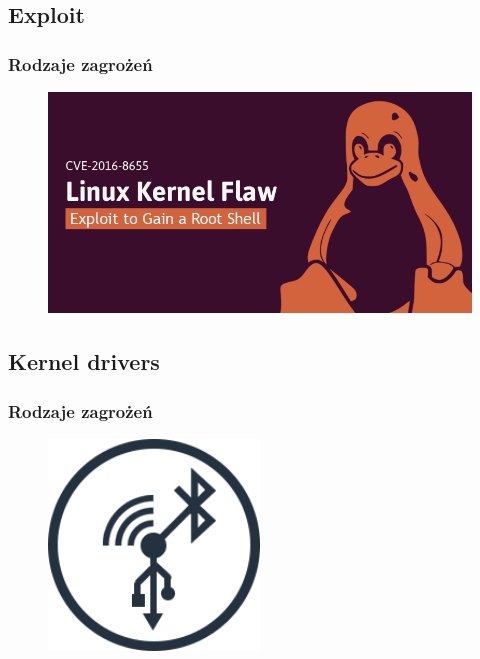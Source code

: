 \documentclass{beamer}
\begin{document}
\subsection{Exploit}
\begin{frame}
	\frametitle{Rodzaje zagrożeń}
	\begin{figure}[H]
	\centering
	\includegraphics[width=1\textwidth]{exploit.png}
	\end{figure}
\end{frame}

\subsection{Kernel drivers}
\begin{frame}
	\frametitle{Rodzaje zagrożeń}
	\begin{figure}[H]
	\centering
	\includegraphics[width=0.5\textwidth]{drivers.png}
	\end{figure}
\end{frame}
\end{document}

